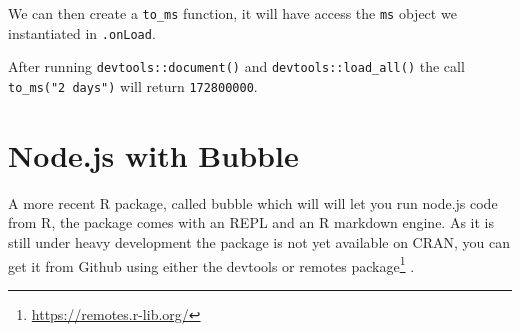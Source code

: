 \documentclass[
]{krantz}
\makeatletter
\newenvironment{Shaded}{\begin{snugshade}}{\end{snugshade}}
\newcommand{\CommentTok}[1]{\textcolor[rgb]{0.37,0.37,0.37}{\textit{#1}}}
\newcommand{\ControlFlowTok}[1]{\textcolor[rgb]{0.27,0.27,0.27}{\textbf{#1}}}
\newcommand{\DataTypeTok}[1]{\textcolor[rgb]{0.27,0.27,0.27}{#1}}
\newcommand{\KeywordTok}[1]{\textcolor[rgb]{0.27,0.27,0.27}{\textbf{#1}}}
\newcommand{\NormalTok}[1]{#1}
\newcommand{\OperatorTok}[1]{\textcolor[rgb]{0.43,0.43,0.43}{\textbf{#1}}}
\newcommand{\OtherTok}[1]{\textcolor[rgb]{0.37,0.37,0.37}{#1}}
\newcommand{\StringTok}[1]{\textcolor[rgb]{0.5,0.5,0.5}{#1}}
\renewcommand{\href}[2]{#2\footnote{\url{#1}}}
\newenvironment{kframe}{%
\medskip{}
\setlength{\fboxsep}{.8em}
 \def\at@end@of@kframe{}%
 \ifinner\ifhmode%
  \def\at@end@of@kframe{\end{minipage}}%
  \begin{minipage}{\columnwidth}%
 \fi\fi%
 \def\FrameCommand##1{\hskip\@totalleftmargin \hskip-\fboxsep
 \colorbox{shadecolor}{##1}\hskip-\fboxsep
     \hskip-\linewidth \hskip-\@totalleftmargin \hskip\columnwidth}%
 \MakeFramed {\advance\hsize-\width
   \@totalleftmargin\z@ \linewidth\hsize
   \@setminipage}}%
 {\par\unskip\endMakeFramed%
 \at@end@of@kframe}
\renewenvironment{Shaded}{\begin{kframe}}{\end{kframe}}
\makeatother
\begin{document}
\begin{Shaded}
\end{Shaded}

We can then create a \texttt{to\_ms} function, it will have access the \texttt{ms} object we instantiated in \texttt{.onLoad}.

\begin{Shaded}
\end{Shaded}

After running \texttt{devtools::document()} and \texttt{devtools::load\_all()} the call \texttt{to\_ms("2\ days")} will return \texttt{172800000}.

\hypertarget{node}{%
\chapter{Node.js with Bubble}\label{node}}

A more recent R package, called bubble which will will let you run node.js code from R, the package comes with an REPL and an R markdown engine. As it is still under heavy development the package is not yet available on CRAN, you can get it from Github using either the devtools or \href{https://remotes.r-lib.org/}{remotes package} \citep{R-remotes}.
\end{document}
